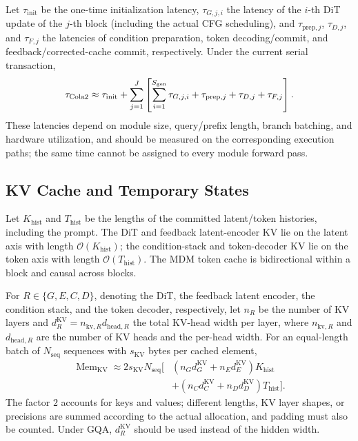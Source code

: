 Let $\tau_{\mathrm{init}}$ be the one-time initialization latency, $\tau_{G,j,i}$ the latency of the $i$-th DiT update of the $j$-th block (including the actual CFG scheduling), and $\tau_{\mathrm{prep},j}$, $\tau_{D,j}$, and $\tau_{F,j}$ the latencies of condition preparation, token decoding/commit, and feedback/corrected-cache commit, respectively. Under the current serial transaction,
\begin{equation}
    \tau_{\text{Cola2}}
    \approx\tau_{\mathrm{init}}+
    \sum_{j=1}^{J}\left[
      \sum_{i=1}^{S_{\mathrm{gen}}}\tau_{G,j,i}
      +\tau_{\mathrm{prep},j}+\tau_{D,j}+\tau_{F,j}
    \right].
    \label{eq:app-cost-latency}
\end{equation}
These latencies depend on module size, query/prefix length, branch batching, and hardware utilization, and should be measured on the corresponding execution paths; the same time cannot be assigned to every module forward pass.

\subsection{KV Cache and Temporary States}

Let $K_{\mathrm{hist}}$ and $T_{\mathrm{hist}}$ be the lengths of the committed latent/token histories, including the prompt. The DiT and feedback latent-encoder KV lie on the latent axis with length $\mathcal O(K_{\mathrm{hist}})$; the condition-stack and token-decoder KV lie on the token axis with length $\mathcal O(T_{\mathrm{hist}})$. The MDM token cache is bidirectional within a block and causal across blocks.

For $R\in\{G,E,C,D\}$, denoting the DiT, the feedback latent encoder, the condition stack, and the token decoder, respectively, let $n_R$ be the number of KV layers and $d_R^{\mathrm{KV}}=n_{\mathrm{kv},R}d_{\mathrm{head},R}$ the total KV-head width per layer, where $n_{\mathrm{kv},R}$ and $d_{\mathrm{head},R}$ are the number of KV heads and the per-head width. For an equal-length batch of $N_{\mathrm{seq}}$ sequences with $s_{\mathrm{KV}}$ bytes per cached element,
\begin{equation}
\begin{aligned}
    \operatorname{Mem}_{\mathrm{KV}}
    \approx 2s_{\mathrm{KV}}N_{\mathrm{seq}}\Big[&
       (n_Gd_G^{\mathrm{KV}}+n_Ed_E^{\mathrm{KV}})K_{\mathrm{hist}}\\
       &+(n_Cd_C^{\mathrm{KV}}+n_Dd_D^{\mathrm{KV}})T_{\mathrm{hist}}\Big].
\end{aligned}
\label{eq:app-cost-kv}
\end{equation}
The factor $2$ accounts for keys and values; different lengths, KV layer shapes, or precisions are summed according to the actual allocation, and padding must also be counted. Under GQA, $d_R^{\mathrm{KV}}$ should be used instead of the hidden width.


